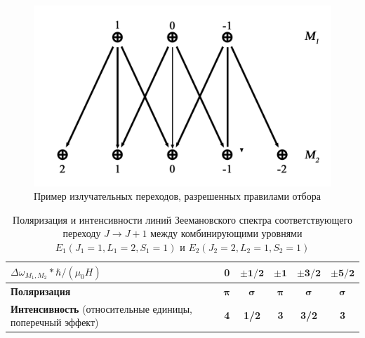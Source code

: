 \begin{figure}[H]
    \centering
    \includegraphics[width=.7\textwidth]{fig/fig3.pdf}
    \caption{Пример излучательных переходов, разрешенных правилами отбора} 
    \label{fig:3}   
\end{figure}


\begin{table}[H]
    \setlength{\tabcolsep}{6pt}
    \caption{Поляризация и интенсивности линий Зеемановского спектра соответствующего переходу $J \rightarrow J+1$ между комбинирующими уровнями $ E_1(J_1=1,L_1=2,S_1=1)$ и $E_2(J_2=2,L_2=1,S_2=1) $} 
    \centering 
    \begin{tabular}{|p{8cm}|c|c|c|c|c|}
    \hline
    $\Delta \omega_{M_1 , M_2} * \hbar / (\mu_0 H) $ & \textbf{0} & $\mathbf{\pm 1/2}$ & $\mathbf{\pm 1}$ & $\mathbf{\pm 3/2}$ & $\mathbf{\pm 5/2}$ \\ \hline
    \textbf{Поляризация}  & $\mathbf{\boldsymbol\pi}$ & $ \mathbf{\boldsymbol\sigma} $ & $\mathbf{\boldsymbol\pi}$ & $ \mathbf{\boldsymbol\sigma} $ & $\mathbf{\boldsymbol\sigma} $ \\ \hline
    \textbf{Интенсивность}  (относительные единицы, поперечный эффект) & \textbf{4} &  \textbf{1/2} & \textbf{3}  & \textbf{3/2} & \textbf{3} \\ \hline
    \end{tabular}
    \label{tab:2}
\end{table}
